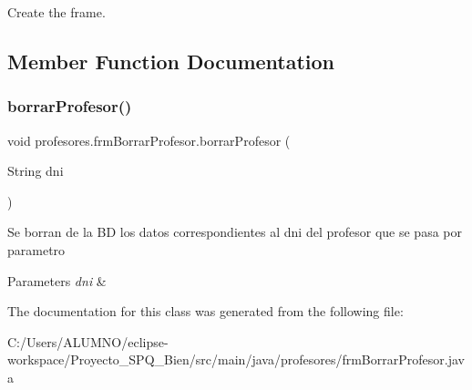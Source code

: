 Create the frame. 

\subsection{Member Function Documentation}
\mbox{\label{classprofesores_1_1frm_borrar_profesor_a4a696b4839a73c038bab645d5e1030eb}} 
\subsubsection{\texorpdfstring{borrar\+Profesor()}{borrarProfesor()}}
{\footnotesize\ttfamily void profesores.\+frm\+Borrar\+Profesor.\+borrar\+Profesor (\begin{DoxyParamCaption}\item[{String}]{dni }\end{DoxyParamCaption})}

Se borran de la BD los datos correspondientes al dni del profesor que se pasa por parametro 
\begin{DoxyParams}{Parameters}
{\em dni} & \\
\hline
\end{DoxyParams}


The documentation for this class was generated from the following file\+:\begin{DoxyCompactItemize}
\item 
C\+:/\+Users/\+A\+L\+U\+M\+N\+O/eclipse-\/workspace/\+Proyecto\+\_\+\+S\+P\+Q\+\_\+Bien/src/main/java/profesores/frm\+Borrar\+Profesor.\+java\end{DoxyCompactItemize}
